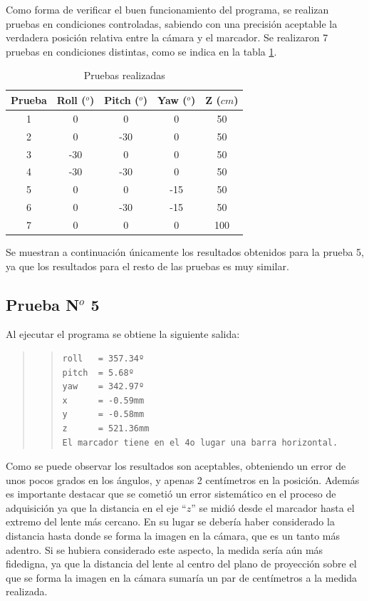 \documentclass[main]{subfiles}
\begin{document}
Como forma de verificar el buen funcionamiento del programa, se realizan pruebas en condiciones controladas, sabiendo con una precisión aceptable la verdadera posición relativa entre la cámara y el marcador. Se realizaron 7 pruebas en condiciones distintas, como se indica en la tabla \ref{tab:pruebas}.
\begin{table}[H]
\centering
\begin{tabular}{|c|c|c|c|c|} 
\hline \cellcolor[gray]{0.8} \textbf{Prueba} & \cellcolor[gray]{0.8} \textbf{Roll ($^o$)} & \cellcolor[gray]{0.8} \textbf{Pitch ($^o$)} & \cellcolor[gray]{0.8} \textbf{Yaw ($^o$)} & \cellcolor[gray]{0.8} \textbf{Z ($cm$)}\\ 
\hline 1 & 0   & 0   & 0   & 50 \\ 
\hline 2 & 0   & -30 & 0   & 50 \\ 
\hline 3 & -30 & 0   & 0   & 50 \\ 
\hline 4 & -30 & -30 & 0   & 50 \\ 
\hline 5 & 0   & 0   & -15 & 50 \\ 
\hline 6 & 0   & -30 & -15 & 50 \\ 
\hline 7 & 0   & 0   & 0   & 100 \\
\hline
\end{tabular} 
\caption{Pruebas realizadas}
\label{tab:pruebas}
\end{table}

Se muestran a continuación únicamente los resultados obtenidos para la prueba 5, ya que los resultados para el resto de las pruebas es muy similar.

\subsection{Prueba N$^o$ 5}

Al ejecutar el programa se obtiene la siguiente salida:

\begin{quote}
\begin{quote}
\begin{verbatim}
roll   = 357.34º
pitch  = 5.68º
yaw    = 342.97º
x      = -0.59mm
y      = -0.58mm
z      = 521.36mm
El marcador tiene en el 4o lugar una barra horizontal.
\end{verbatim}
\end{quote}
\end{quote}

Como se puede observar los resultados son aceptables, obteniendo un error de unos pocos grados en los ángulos, y apenas 2 centímetros en la posición. Además es importante destacar que se cometió un error sistemático en el proceso de adquisición ya que la distancia en el eje ``$z$'' se midió desde el marcador hasta el extremo del lente más cercano. En su lugar se debería haber considerado la distancia hasta donde se forma la imagen en la cámara, que es un tanto más adentro. Si se hubiera considerado este aspecto, la medida sería aún más fidedigna, ya que la distancia del lente al centro del plano de proyección sobre el que se forma la imagen en la cámara sumaría un par de centímetros a la medida realizada.
\end{document}
